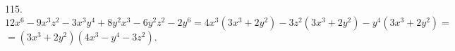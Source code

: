 115. $12x^6-9x^3z^2-3x^3y^4+8y^2x^3-6y^2z^2-2y^6=4x^3(3x^3+2y^2)-3z^2(3x^3+2y^2)-y^4(3x^3+2y^2)=$\\$=(3x^3+2y^2)(4x^3-y^4-3z^2).$\\
